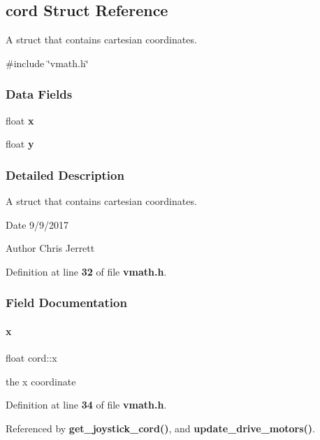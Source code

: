\subsection{cord Struct Reference}
\label{structcord}


A struct that contains cartesian coordinates.  




{\ttfamily \#include \char`\"{}vmath.\+h\char`\"{}}

\subsubsection*{Data Fields}
\begin{DoxyCompactItemize}
\item 
float \textbf{ x}
\item 
float \textbf{ y}
\end{DoxyCompactItemize}


\subsubsection{Detailed Description}
A struct that contains cartesian coordinates. 

\begin{DoxyDate}{Date}
9/9/2017 
\end{DoxyDate}
\begin{DoxyAuthor}{Author}
Chris Jerrett 
\end{DoxyAuthor}


Definition at line \textbf{ 32} of file \textbf{ vmath.\+h}.



\subsubsection{Field Documentation}
\mbox{\label{structcord_a2eef9b681474b679cf87b0c20eced2cd}} 
\paragraph{x}
{\footnotesize\ttfamily float cord\+::x}

the x coordinate 

Definition at line \textbf{ 34} of file \textbf{ vmath.\+h}.



Referenced by \textbf{ get\+\_\+joystick\+\_\+cord()}, and \textbf{ update\+\_\+drive\+\_\+motors()}.

